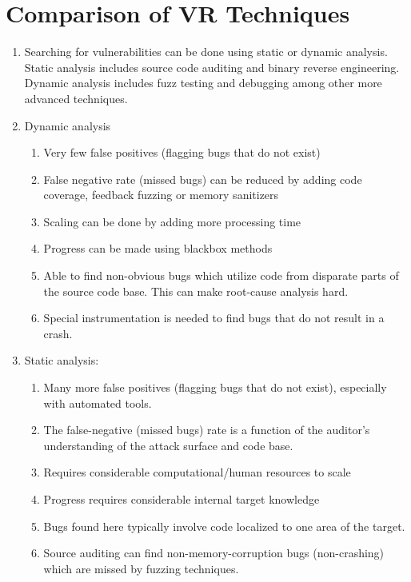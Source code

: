 \documentclass[12pt]{Training}
\begin{document}
\section*{Comparison of VR Techniques}
\begin{enumerate}
	\item Searching for vulnerabilities can be done using static or dynamic analysis. Static analysis includes source code auditing and binary reverse engineering. Dynamic analysis includes fuzz testing and debugging among other more advanced techniques.
	\item Dynamic analysis
		\begin{enumerate}
			\item Very few false positives (flagging bugs that do not exist)
			\item False negative rate (missed bugs) can be reduced by adding code coverage, feedback fuzzing or memory sanitizers
			\item Scaling can be done by adding more processing time
			\item Progress can be made using blackbox methods
			\item Able to find non-obvious bugs which utilize code from disparate parts of the source code base. This can make root-cause analysis hard.
			\item Special instrumentation is needed to find bugs that do not result in a crash.
		\end{enumerate}
	\item Static analysis:
		\begin{enumerate}
			\item Many more false positives (flagging bugs that do not exist), especially with automated tools.
			\item The false-negative (missed bugs) rate is a function of the auditor's understanding of the attack surface and code base.
			\item Requires considerable computational/human resources to scale
			\item Progress requires considerable internal target knowledge
			\item Bugs found here typically involve code localized to one area of the target.
			\item Source auditing can find non-memory-corruption bugs (non-crashing) which are missed by fuzzing techniques.
		\end{enumerate}
\end{enumerate}
\end{document}
